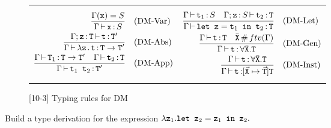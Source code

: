 \documentclass{amsart}
\begin{document}
\begin{figure}[h]
  \begin{tabular}{p{\colwid}|p{\colwid}}
    {\begin{minipage}{\colwid}
      \setlength{\jot}{1em}
      \begin{align*}
        \frac{\Gamma(\texttt{x}) = S}
             {\Gamma \operatorname{\vdash} \texttt{x} \operatorname{:} S}& &
          &\textup{(DM-Var)} \\
        \frac{\Gamma; \texttt{z} \operatorname{:} \texttt{T} \operatorname{\vdash}
              \texttt{t} \operatorname{:} \texttt{T}^\prime}
             {\Gamma \operatorname{\vdash} \lambda \texttt{z.t} \operatorname{:} \texttt{T} \to
              \texttt{T}^\prime}& &
          &\textup{(DM-Abs)} \\
        \frac{\Gamma \operatorname{\vdash} \texttt{T}_1 \operatorname{:} \texttt{T} \to \texttt{T}^\prime
              \quad \Gamma \operatorname{\vdash} \texttt{t}_2 \operatorname{:} \texttt{T}}
             {\Gamma \operatorname{\vdash} \texttt{t}_1\texttt{ t}_2 \operatorname{:} \texttt{T}^\prime}&
          & &\textup{(DM-App)}
      \end{align*}
    \end{minipage}}
    &
    {\begin{minipage}{\colwid}
      \setlength{\jot}{1em}
      \begin{align*}
        \frac{\Gamma \operatorname{\vdash} \texttt{t}_1 \operatorname{:} S \quad \Gamma; \texttt{z}
              \operatorname{:} S \operatorname{\vdash} \texttt{t}_2 \operatorname{:} \texttt{T}}
             {\Gamma \operatorname{\vdash} \texttt{let z} = \texttt{t}_1 \texttt{ in t}_2 \operatorname{:}
              \texttt{T}}& &
          &\textup{(DM-Let)} \\
        \frac{\Gamma \operatorname{\vdash} \texttt{t} \operatorname{:} \texttt{T} \quad
              \bar{\texttt{X}} \operatorname{\#} ftv(\Gamma)}
             {\Gamma \operatorname{\vdash} \texttt{t} \operatorname{:} \forall\bar{\texttt{X}}.\texttt{T}}&
          & &\textup{(DM-Gen)} \\
        \frac{\Gamma \operatorname{\vdash} \texttt{t} \operatorname{:} \forall\bar{\texttt{X}}.\texttt{T}}
             {\Gamma \operatorname{\vdash} \texttt{t} \operatorname{:} [\vec{\texttt{X}} \mapsto
              \vec{\texttt{T}}]\texttt{T}}& &
          &\textup{(DM-Inst)}
      \end{align*}
    \end{minipage}}
  \end{tabular}
  \caption{[10-3] Typing rules for DM}
\end{figure}

\begin{problem}[10.1.22]
  Build a type derivation for the expression \(\lambda \texttt{z}_1 .
  \texttt{let z}_2 = \texttt{z}_1 \texttt{ in z}_2.\)
\end{problem}
\end{document}
